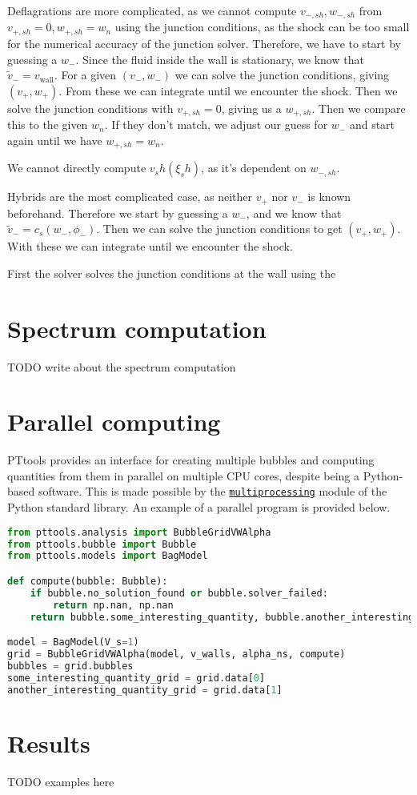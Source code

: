 Deflagrations are more complicated,
as we cannot compute $v_{-,sh}, w_{-,sh}$ from $v_{+,sh}=0, w_{+,sh}=w_n$ using the junction conditions,
as the shock can be too small for the numerical accuracy of the junction solver.
Therefore, we have to start by guessing a $w_-$.
Since the fluid inside the wall is stationary, we know that $\tilde{v}_- = v_{\text{wall}}$.
For a given $(v_-, w_-)$ we can solve the junction conditions, giving $(v_+, w_+)$.
From these we can integrate until we encounter the shock.
Then we solve the junction conditions with $v_{+,sh} = 0$, giving us a $w_{+,sh}$.
Then we compare this to the given $w_n$.
If they don't match, we adjust our guess for $w_-$ and start again until we have $w_{+,sh} = w_n$.

We cannot directly compute $v_sh(\xi_sh)$, as it's dependent on $w_{-,sh}$.


Hybrids are the most complicated case, as neither $v_+$ nor $v_-$ is known beforehand.
Therefore we start by guessing a $w_-$, and we know that $\tilde{v}_- = c_s(w_-, \phi_-)$.
Then we can solve the junction conditions to get $(v_+, w_+)$.
With these we can integrate until we encounter the shock.



First the solver solves the junction conditions at the wall using the 





\section{Spectrum computation}
TODO write about the spectrum computation


\section{Parallel computing}
PTtools provides an interface for creating multiple bubbles and computing quantities from them in parallel on multiple CPU cores, despite being a Python-based software.
This is made possible by the
\href{https://docs.python.org/3/library/multiprocessing.html}{\texttt{multiprocessing}}
module of the Python standard library.
An example of a parallel program is provided below.

\begin{lstlisting}[language=Python]
from pttools.analysis import BubbleGridVWAlpha
from pttools.bubble import Bubble
from pttools.models import BagModel

def compute(bubble: Bubble):
	if bubble.no_solution_found or bubble.solver_failed:
		return np.nan, np.nan
	return bubble.some_interesting_quantity, bubble.another_interesting_quantity

model = BagModel(V_s=1)
grid = BubbleGridVWAlpha(model, v_walls, alpha_ns, compute)
bubbles = grid.bubbles
some_interesting_quantity_grid = grid.data[0]
another_interesting_quantity_grid = grid.data[1]
\end{lstlisting}


\section{Results}
TODO examples here

